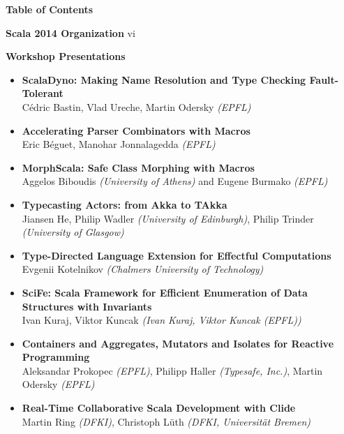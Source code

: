 \documentclass[10pt]{book}
\title{}
\date{}
\begin{document}
\thispagestyle{empty}


{\centering \LARGE \bf Table of Contents\par}

\vspace{0.5cm}
\large \textbf{Scala 2014 Organization}  vi
\normalsize

\vspace{0.5cm}
\large \textbf{Workshop Presentations}
\normalsize
\begin{itemize}
\item {\bf ScalaDyno: Making Name Resolution and Type Checking Fault-Tolerant} \\
C\'{e}dric Bastin, Vlad Ureche, Martin Odersky {\em (EPFL)}
\item {\bf Accelerating Parser Combinators with Macros} \\
Eric B\'{e}guet, Manohar Jonnalagedda {\em (EPFL)}
\item {\bf MorphScala: Safe Class Morphing with Macros} \\
Aggelos Biboudis {\em (University of Athens)} and Eugene Burmako {\em (EPFL)}
\item {\bf Typecasting Actors: from Akka to TAkka} \\
Jiansen He, Philip Wadler {\em (University of Edinburgh)}, Philip Trinder {\em (University of Glasgow)}
\item {\bf Type-Directed Language Extension for Effectful Computations} \\
Evgenii Kotelnikov {\em (Chalmers University of Technology)}
\item {\bf SciFe: Scala Framework for Efficient Enumeration of Data Structures with Invariants} \\
Ivan Kuraj, Viktor Kuncak {\em (Ivan Kuraj, Viktor Kuncak (EPFL))}
\item {\bf Containers and Aggregates, Mutators and Isolates for Reactive Programming} \\
Aleksandar Prokopec {\em(EPFL)}, Philipp Haller {\em(Typesafe, Inc.)}, Martin Odersky {\em(EPFL)}
\item {\bf Real-Time Collaborative Scala Development with Clide} \\
Martin Ring {\em(DFKI)}, Christoph L\"{u}th {\em(DFKI, Universit\"{a}t Bremen)}
\end{itemize}
\end{document}
